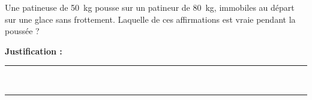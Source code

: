 Une patineuse de \qty{50}{kg} pousse sur un patineur de \qty{80}{kg}, immobiles au départ sur une glace sans frottement. Laquelle de ces affirmations est vraie pendant la poussée ?

\choices

\noindent\textbf{Justification :} \hrulefill \\[2.5ex]
\rule{\linewidth}{0.4pt} \\[2.5ex]
\rule{\linewidth}{0.4pt}
\vfill
